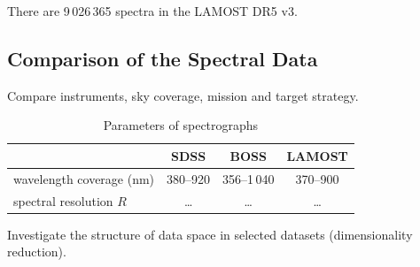 There are 9\,026\,365 spectra in the LAMOST DR5 v3.

\subsection{Comparison of the Spectral Data}

Compare instruments, sky coverage, mission and target strategy.

\begin{table}
	\begin{center}
		\begin{tabular}{|l|c|c|c|}
			\hline
			& SDSS & BOSS & LAMOST \\ \hline \hline
			wavelength coverage (nm) & 380--920 & 356--1\,040 & 370--900 \\ \hline
			spectral resolution \(R\) & \dots & \dots & \dots \\ \hline
		\end{tabular}
	\end{center}
	\caption{Parameters of spectrographs}
\end{table}

Investigate the structure of data space in selected datasets (dimensionality reduction).
